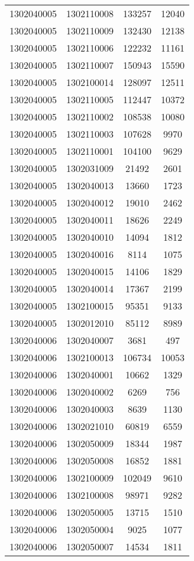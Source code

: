 \begin{longtable}{llcc}
1302040005 & 1302110008 & 133257 & 12040\\
1302040005 & 1302110009 & 132430 & 12138\\
1302040005 & 1302110006 & 122232 & 11161\\
1302040005 & 1302110007 & 150943 & 15590\\
1302040005 & 1302100014 & 128097 & 12511\\
1302040005 & 1302110005 & 112447 & 10372\\
1302040005 & 1302110002 & 108538 & 10080\\
1302040005 & 1302110003 & 107628 & 9970\\
1302040005 & 1302110001 & 104100 & 9629\\
1302040005 & 1302031009 & 21492 & 2601\\
1302040005 & 1302040013 & 13660 & 1723\\
1302040005 & 1302040012 & 19010 & 2462\\
1302040005 & 1302040011 & 18626 & 2249\\
1302040005 & 1302040010 & 14094 & 1812\\
1302040005 & 1302040016 & 8114 & 1075\\
1302040005 & 1302040015 & 14106 & 1829\\
1302040005 & 1302040014 & 17367 & 2199\\
1302040005 & 1302100015 & 95351 & 9133\\
1302040005 & 1302012010 & 85112 & 8989\\
1302040006 & 1302040007 & 3681 & 497\\
1302040006 & 1302100013 & 106734 & 10053\\
1302040006 & 1302040001 & 10662 & 1329\\
1302040006 & 1302040002 & 6269 & 756\\
1302040006 & 1302040003 & 8639 & 1130\\
1302040006 & 1302021010 & 60819 & 6559\\
1302040006 & 1302050009 & 18344 & 1987\\
1302040006 & 1302050008 & 16852 & 1881\\
1302040006 & 1302100009 & 102049 & 9610\\
1302040006 & 1302100008 & 98971 & 9282\\
1302040006 & 1302050005 & 13715 & 1510\\
1302040006 & 1302050004 & 9025 & 1077\\
1302040006 & 1302050007 & 14534 & 1811\\

\end{longtable}
